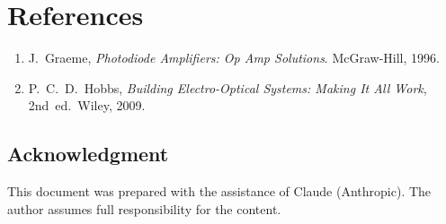 \documentclass[a4paper,11pt]{article}
\begin{document}
\section{References}
\label{sec:references}

\begin{enumerate}
  \item J.~Graeme, \textit{Photodiode Amplifiers: Op Amp Solutions}.
    McGraw-Hill, 1996.
  \item P.~C.~D.~Hobbs,
    \textit{Building Electro-Optical Systems: Making It All Work},
    2nd~ed.\ Wiley, 2009.
\end{enumerate}

\subsection*{Acknowledgment}

This document was prepared with the assistance of Claude (Anthropic).
The author assumes full responsibility for the content.
\end{document}
